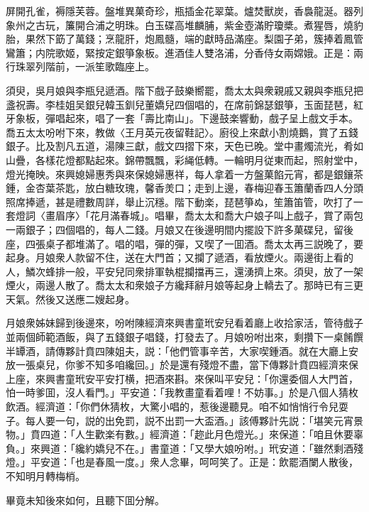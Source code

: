 屏開孔雀，褥隱芙蓉。盤堆異菓奇珍，瓶插金花翠葉。爐焚獸炭，香裊龍涎。器列象州之古玩，簾開合浦之明珠。白玉碟高堆麟脯，紫金壺滿貯瓊槳。煮猩唇，燒豹胎，果然下筯了萬錢；烹龍肝，炮鳳髓，端的獻時品滿座。梨園子弟，簇捧着鳳管鸞簫；内院歌姬，緊按定銀箏象板。進酒佳人雙洛浦，分香侍女兩嫦娥。正是：兩行珠翠列階前，一派笙歌臨座上。

須臾，吳月娘與李瓶兒遞酒。階下戲子鼓樂嚮罷，喬太太與衆親戚又親與李瓶兒把盞祝壽。李桂姐吴銀兒韓玉釧兒董嬌兒四個唱的，在席前錦瑟銀箏，玉面琵琶，紅牙象板，彈唱起來，唱了一套「壽比南山」。下邊鼓楽響動，戲子呈上戲文手本。喬五太太吩咐下來，教做〈王月英元夜留鞋記〉。廚役上來獻小割燒鵝，賞了五錢銀子。比及割凡五道，湯陳三獻，戲文四摺下來，天色已晚。堂中畫燭流光，肴如山疊，各樣花燈都點起來。錦帶飄飄，彩䋲低轉。一輪明月従東而起，照射堂中，燈光掩映。來興媳婦惠秀與來保媳婦惠祥，每人拿着一方盤菓餡元宵，都是銀鑲茶鍾，金杏葉茶匙，放白糖玫瑰，馨香羙口；走到上邊，春梅迎春玉簫蘭香四人分頭照席捧遞，甚是禮數周詳，舉止沉穩。階下動楽，琵琶箏ぬ，笙簫笛管，吹打了一套燈詞〈畫眉序〉「花月滿春城」。唱畢，喬太太和喬大户娘子叫上戲子，賞了兩包一兩銀子；四個唱的，每人二錢。月娘又在後邊明間内擺設下許多菓碟兒，留後座，四張桌子都堆滿了。唱的唱，彈的彈，又喫了一囬酒。喬太太再三説晚了，要起身。月娘衆人款留不住，送在大門首；又攔了遞酒，看放煙火。兩邊街上看的人，鱗次蜂排一般，平安兒同衆排軍執棍攔擋再三，還湧擠上來。須臾，放了一架煙火，兩邊人散了。喬太太和衆娘子方纔拜辭月娘等起身上轎去了。那時已有三更天氣。然後又送應二嫂起身。

月娘衆姊妹歸到後邊來，吩咐陳經濟來興書童玳安兒看着廳上收拾家活，管待戲子並兩個師範酒飯，與了五錢銀子唱錢，打發去了。月娘吩咐出來，剩攢下一桌餚饌半罈酒，請傳夥計賁四陳姐夫，説：「他們管事辛苦，大家喫鍾酒。就在大廳上安放一張桌兒，你爹不知多咱纔回。」於是還有殘燈不盡，當下傳夥計賁四經濟來保上座，來興書童玳安平安打横，把酒來斟。來保叫平安兒：「你還委個人大門首，怕一時爹囬，沒人看門。」平安道：「我教畫童看着哩！不妨事。」於是八個人猜枚飲酒。經濟道：「你們休猜枚，大驚小唱的，惹後邊聽見。咱不如悄悄行令兒耍子。每人要一句，説的出免罰，説不出罰一大盃酒。」該傅夥計先説：「堪笑元宵景物。」賁四道：「人生歡楽有數。」經濟道：「趂此月色燈光。」來保道：「咱且休要辜負。」來興道：「纔約嬌兒不在。」書童道：「又學大娘吩咐。」玳安道：「雖然剩酒殘燈。」平安道：「也是春風一度。」衆人念畢，呵呵笑了。正是：飲罷酒闌人散後，不知明月轉梅梢。

畢竟未知後來如何，且聽下囬分解。

